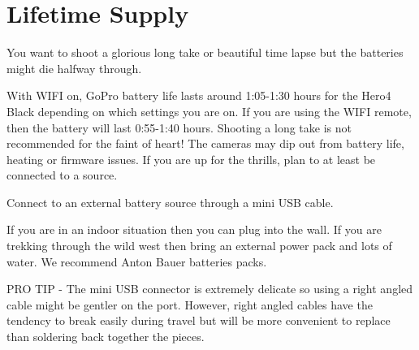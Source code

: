 \chapter{Lifetime Supply}
\pagecolor{white}
\label{chap:8}
\begin{fullwidth}


\problem

{\large You want to shoot a glorious long take or beautiful time lapse but the batteries might die halfway through. 
 \par}

With WIFI on, GoPro battery life lasts around 1:05-1:30 hours for the Hero4 Black depending on which settings you are on. If you are using the WIFI remote, then the battery will last 0:55-1:40 hours. Shooting a long take is not recommended for the faint of heart! The cameras may dip out from battery life, heating or firmware issues. If you are up for the thrills, plan to at least be connected to a source. 


\solution

{\large Connect to an external battery source through a mini USB cable. 

 \par}

If you are in an indoor situation then you can plug into the wall. If you are trekking through the wild west then bring an external power pack and lots of water. We recommend Anton Bauer batteries packs.


PRO TIP - The mini USB connector is extremely delicate so using a right angled cable might be gentler on the port. However, right angled cables have the tendency to break easily during travel but will be more convenient to replace than soldering back together the pieces. 





\clearpage
\end{fullwidth}
